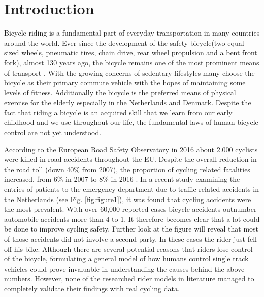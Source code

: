 \chapter{Introduction}
\label{introduction}

Bicycle riding is a fundamental part of everyday transportation in many countries around the world. Ever since the development of the safety bicycle(two equal sized wheels, pneumatic tires, chain drive, rear wheel propulsion and a bent front fork), almost 130 years ago, the bicycle remains  one of the most prominent means of transport \cite{kooijman2013review}. With the growing concerns of sedentary lifestyles many choose the bicycle as their primary commute vehicle with the hopes of maintaining some levels of fitness. Additionally the bicycle is the preferred means of physical exercise for the elderly especially in the Netherlands and Denmark. Despite the fact that riding a bicycle is an acquired skill that we learn from our early childhood and we use throughout our life, the fundamental laws of human bicycle control are not yet understood.
\par

According to the European Road Safety Observatory \cite{eu2018cycle} in 2016 about 2.000 cyclists
were killed in road accidents throughout the EU. Despite the overall reduction in the road toll (down 40\% from 2007), the proportion of cycling related fatalities increased, from 6\% in 2007 to 8\% in 2016 \cite{eu2018cycle}. In a recent study examining the entries of patients to the emergency department due to traffic related accidents in the Netherlands (see Fig. \ref{fig:figure1}), it was found that cycling accidents were the most prevalent. With over 60,000 reported cases  bicycle accidents outnumber automobile accidents more than 4 to 1. It therefore  becomes clear that a lot could be done to improve cycling safety. Further look at the figure will reveal that most of those accidents did not involve a second party. In these cases the rider just fell off his bike. Although there are several potential reasons that riders lose control of the bicycle, formulating a general model of  how humans control single track vehicles could prove invaluable in understanding the causes behind the above numbers. However,  none of the researched rider models in literature managed to completely validate their findings with real cycling data.

